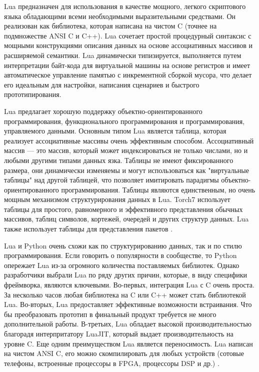 \documentclass[a4paper,english,russian]{G2-105}
\begin{document}
\par Lua предназначен для использования в качестве мощного, легкого скриптового языка обладающими всеми необходимыми выразительными средствами. Он реализован как библиотека, которая написана на чистом C (точнее на подмножестве ANSI C и C++). Lua сочетает простой процедурный синтаксис с мощными конструкциями описания данных на основе ассоциативных массивов и расширяемой семантики. Lua динамически типизируется, выполняется путем интерпретации байт-кода для виртуальной машины на основе регистров и имеет автоматическое управление памятью с инкрементной сборкой мусора, что делает его идеальным для настройки, написания сценариев и быстрого прототипирования.
\par Lua предлагает хорошую поддержку объектно-ориентированного программирования, функционального программирования и программирования, управляемого данными. Основным типом Lua является таблица, которая реализует ассоциативные массивы очень эффективным способом. Ассоциативный массив --- это массив, который может индексироваться не только числами, но и любыми другими типами данных язка. Таблицы не имеют фиксированного размера, они динамически изменяемы и могут использоваться как "виртуальные таблицы" над другой таблицей, что позволяет имитировать парадигмы объектно-ориентированного программирования. Таблицы являются единственным, но очень мощным механизмом структурирования данных в Lua. Torch7 использует таблицы для простого, равномерного и эффективного представления обычных массивов, таблиц символов, кортежей, очередей и других структур данных. Lua также использует таблицы для представления пакетов \cite{7}.
\par Lua и Python очень схожи как по структурированию данных, так и по стилю программирования. Если говорить о популярности в сообществе, то Python опережает Lua из-за огромного количества поставляемых библиотек. Однако разработчики выбрали Lua по ряду других причин, которые, в виду специфики фреймворка, являются ключевыми. Во-первых, интеграция Lua с C очень проста. За несколько часов любая библиотека на C или C++ может стать библиотекой Lua. Во-вторых, Lua предоставляет эффективные возможности встраивания. Что бы преобразовать прототип в финальный продукт требуется не много дополнительной работы. В-третьих, Lua обладает высокой производительностью благорадя интерпритатору LuaJIT, который выдает производительность на уровне C. Еще одним преимуществом Lua является переносимость. Lua написан на чистом ANSI C, его можно скомпилировать для любых устройств (сотовые телефоны, встроенные процессоры в FPGA, процессоры DSP и др.) \cite{8}.
\ttl
\end{document}
